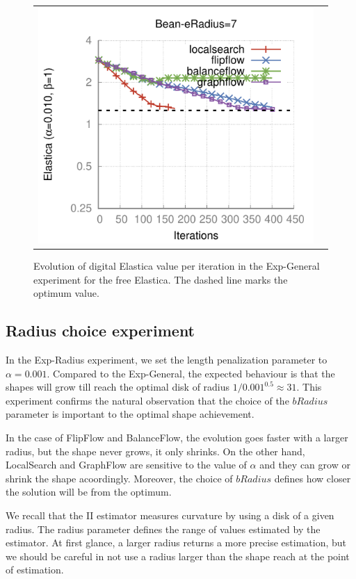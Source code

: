 \begin{figure}
\begin{tabular}{cc}
\includegraphics[scale=0.45]{figures/chapter9/free-elastica/plots/iteration/main_experiment/len_pen_0.01/radius-7/bean.pdf}
\end{tabular}
\caption{Evolution of digital Elastica value per iteration in the Exp-General experiment for the free Elastica. The dashed line marks the optimum value.}
\label{fig:plots-free-elastica-general}
\end{figure}

\subsection{Radius choice experiment}

In the Exp-Radius experiment, we set the length penalization parameter to $\alpha=0.001$. Compared to the Exp-General, the expected behaviour is that the shapes will grow till reach the optimal disk of radius $1/0.001^{0.5} \approx 31$. This experiment confirms the natural observation that the choice of the $bRadius$ parameter is important to the optimal shape achievement.

In the case of FlipFlow and BalanceFlow, the evolution goes faster with a larger radius, but the shape never grows, it only shrinks. On the other hand, LocalSearch and GraphFlow are sensitive to the value of $\alpha$ and they can grow or shrink the shape acoordingly. Moreover, the choice of $bRadius$ defines how closer the solution will be from the optimum.

We recall that the II estimator measures curvature by using a disk of a given radius. The radius parameter defines the range of values estimated by the estimator. At first glance, a larger radius returns a more precise estimation, but we should be careful in not use a radius larger than the shape reach at the point of estimation.

